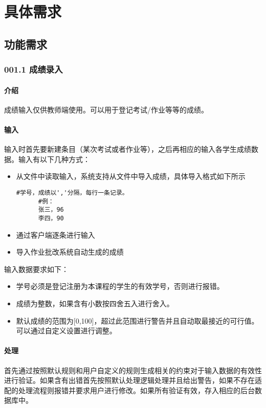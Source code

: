 \chapter{具体需求}
\section{功能需求}
  \subsection{001.1 成绩录入}
    \subsubsection{介绍}
    成绩输入仅供教师端使用。可以用于登记考试/作业等等的成绩。
    \subsubsection{输入}
    输入时首先要新建条目（某次考试或者作业等），之后再相应的输入各学生成绩数据。输入有以下几种方式：
    \begin{itemize}
      \item 从文件中读取输入，系统支持从文件中导入成绩，具体导入格式如下所示
      \begin{lstlisting}[caption=文件导入成绩示例, label={code:import_grade_from_file}]
      #学号，成绩以','分隔，每行一条记录。
      #例：
      张三，96
      李四，90
      \end{lstlisting}
      \item 通过客户端逐条进行输入
      \item 导入作业批改系统自动生成的成绩
    \end{itemize}
    输入数据要求如下：
    \begin{itemize}
      \item 学号必须是登记注册为本课程的学生的有效学号，否则进行报错。
      \item 成绩为整数，如果含有小数按四舍五入进行舍入。
      \item 默认成绩的范围为[0,100]，超过此范围进行警告并且自动取最接近的可行值。可以通过自定义设置进行调整。
    \end{itemize}
    \subsubsection{处理}
    首先通过按照默认规则和用户自定义的规则生成相关的约束对于输入数据的有效性进行验证。如果含有出错首先按照默认处理逻辑处理并且给出警告，如果不存在适配的处理流程则报错并要求用户进行修改。如果所有验证有效，存入相应的后台数据库中。

